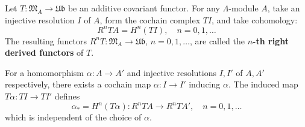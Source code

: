 Let $T : \mathfrak{M}_A \rightarrow \mathfrak{Ub}$ be an additive covariant functor. For any $\Lambda$-module $A$, take an injective resolution $I$ of $A$, form the cochain complex $TI$, and take cohomology:
$$R^n TA = H^n(TI), \quad n = 0, 1, \ldots$$
The resulting functors $R^n T : \mathfrak{M}_A \rightarrow \mathfrak{Ub}$, $n = 0, 1, \ldots$, are called the \textbf{$n$-th right derived functors} of $T$.

For a homomorphism $\alpha : A \rightarrow A'$ and injective resolutions $I, I'$ of $A, A'$ respectively, there exists a cochain map $\alpha : I \rightarrow I'$ inducing $\alpha$. The induced map $T\alpha : TI \rightarrow TI'$ defines
$$\alpha_* = H^n(T\alpha) : R^n TA \rightarrow R^n TA', \quad n = 0, 1, \ldots$$
which is independent of the choice of $\alpha$.
